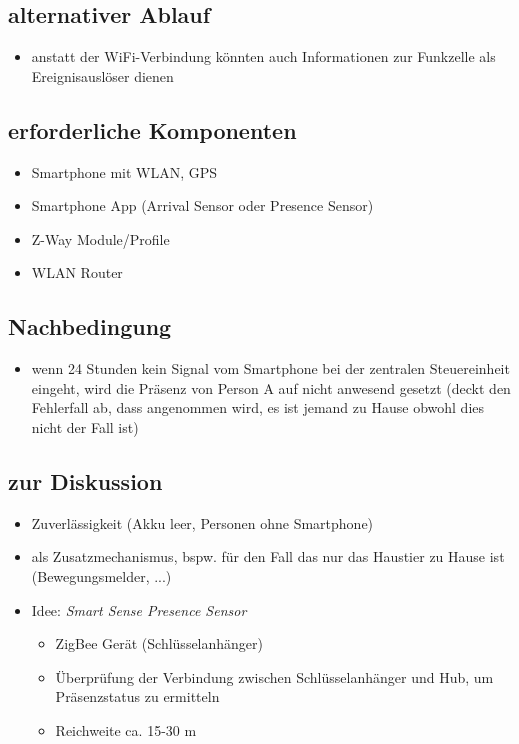 \subsection{alternativer Ablauf}
\begin{itemize}
	\item anstatt der WiFi-Verbindung könnten auch Informationen zur Funkzelle als Ereignisauslöser dienen
\end{itemize}

\subsection{erforderliche Komponenten}
\begin{itemize}
	\item Smartphone mit WLAN, GPS
	\item Smartphone App (Arrival Sensor oder Presence Sensor)
	\item Z-Way Module/Profile
	\item WLAN Router
\end{itemize}

\subsection{Nachbedingung}
\begin{itemize}
	\item wenn 24 Stunden kein Signal vom Smartphone bei der zentralen Steuereinheit eingeht, wird die Präsenz von Person A auf nicht anwesend gesetzt (deckt den Fehlerfall ab, dass angenommen wird, es ist jemand zu Hause obwohl dies nicht der Fall ist)
\end{itemize}

\subsection{zur Diskussion}
\begin{itemize}
	\item Zuverlässigkeit (Akku leer, Personen ohne Smartphone)
	\item als Zusatzmechanismus, bspw. für den Fall das nur das Haustier zu Hause ist (Bewegungsmelder, ...)
	\item Idee: \emph{Smart Sense Presence Sensor}
	\begin{itemize}
		\item ZigBee Gerät (Schlüsselanhänger)
		\item Überprüfung der Verbindung zwischen Schlüsselanhänger und Hub, um Präsenzstatus zu ermitteln
		\item Reichweite ca. 15-30 m
	\end{itemize}
\end{itemize}


